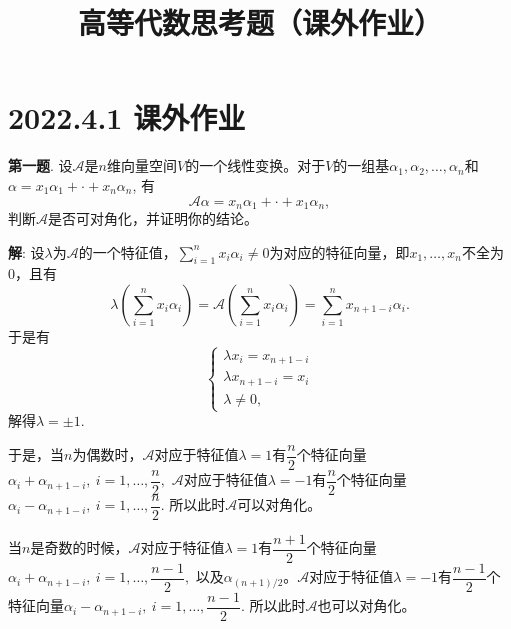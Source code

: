 
\renewcommand{\newpageorvspace}{\vspace{2em}}

\title{高等代数思考题（课外作业）}

\author{}
\date{}



\maketitle

\section{2022.4.1 课外作业}

{\bf 第一题}. 设$\mathscr{A}$是$n$维向量空间$V$的一个线性变换。对于$V$的一组基$\alpha_1, \alpha_2, \ldots, \alpha_n$和$\alpha = x_1\alpha_1 + \cdot + x_n\alpha_n$, 有
$$\mathscr{A}\alpha = x_n\alpha_1 + \cdot + x_1\alpha_n,$$
判断$\mathscr{A}$是否可对角化，并证明你的结论。

{\bf 解}: 设$\lambda$为$\mathscr{A}$的一个特征值，$\sum\limits_{i=1}^n x_i \alpha_i \neq 0$为对应的特征向量，即$x_1,\ldots,x_n$不全为0，且有
$$\lambda(\sum\limits_{i=1}^n x_i \alpha_i) = \mathscr{A}(\sum\limits_{i=1}^n x_i \alpha_i) = \sum\limits_{i=1}^n x_{n+1-i} \alpha_i.$$
于是有
$$
\begin{cases}
\lambda x_i = x_{n+1-i} \\
\lambda x_{n+1-i} = x_i \\
\lambda \neq 0,
\end{cases}
$$
解得$\lambda = \pm 1$. 

于是，当$n$为偶数时，$\mathscr{A}$对应于特征值$\lambda = 1$有$\dfrac{n}{2}$个特征向量$\alpha_i + \alpha_{n+1-i}, ~ i = 1, \ldots, \dfrac{n}{2},$ $\mathscr{A}$对应于特征值$\lambda = -1$有$\dfrac{n}{2}$个特征向量$\alpha_i - \alpha_{n+1-i}, ~ i = 1, \ldots, \dfrac{n}{2}.$ 所以此时$\mathscr{A}$可以对角化。

当$n$是奇数的时候，$\mathscr{A}$对应于特征值$\lambda = 1$有$\dfrac{n+1}{2}$个特征向量$\alpha_i + \alpha_{n+1-i}, ~ i = 1, \ldots, \dfrac{n-1}{2},$ 以及$\alpha_{(n+1)/2}$。$\mathscr{A}$对应于特征值$\lambda = -1$有$\dfrac{n-1}{2}$个特征向量$\alpha_i - \alpha_{n+1-i}, ~ i = 1, \ldots, \dfrac{n-1}{2}.$ 所以此时$\mathscr{A}$也可以对角化。

